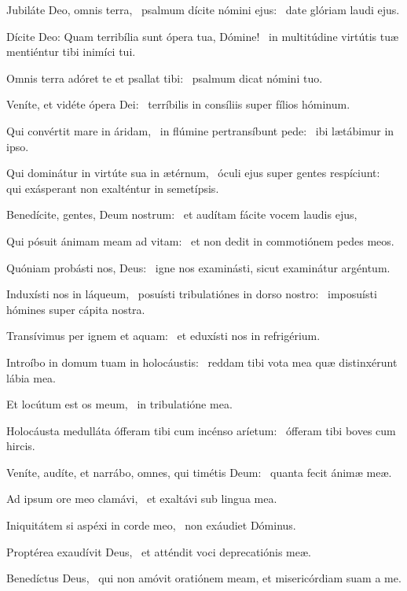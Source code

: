 \item Jubiláte Deo, omnis terra,~\pscross{} psalmum dícite nómini ejus:~\psstar{} date glóriam laudi ejus.

\item Dícite Deo: Quam terribília sunt ópera tua, Dómine!~\psstar{} in multitúdine virtútis tuæ mentiéntur tibi inimíci tui.

\item Omnis terra adóret te et psallat tibi:~\psstar{} psalmum dicat nómini tuo.

\item Veníte, et vidéte ópera Dei:~\psstar{} terríbilis in consíliis super fílios hóminum.

\item Qui convértit mare in áridam,~\pscross{} in flúmine pertransíbunt pede:~\psstar{} ibi lætábimur in ipso.

\item Qui dominátur in virtúte sua in ætérnum,~\pscross{} óculi ejus super gentes respíciunt:~\psstar{} qui exásperant non exalténtur in semetípsis.

\item Benedícite, gentes, Deum nostrum:~\psstar{} et audítam fácite vocem laudis ejus,

\item Qui pósuit ánimam meam ad vitam:~\psstar{} et non dedit in commotiónem pedes meos.

\item Quóniam probásti nos, Deus:~\psstar{} igne nos examinásti, sicut examinátur argéntum.

\item Induxísti nos in láqueum,~\pscross{} posuísti tribulatiónes in dorso nostro:~\psstar{} imposuísti hómines super cápita nostra.

\item Transívimus per ignem et aquam:~\psstar{} et eduxísti nos in refrigérium.

\item Introíbo in domum tuam in holocáustis:~\psstar{} reddam tibi vota mea quæ distinxérunt lábia mea.

\item Et locútum est os meum,~\psstar{} in tribulatióne mea.

\item Holocáusta medulláta ófferam tibi cum incénso aríetum:~\psstar{} ófferam tibi boves cum hircis.

\item Veníte, audíte, et narrábo, omnes, qui timétis Deum:~\psstar{} quanta fecit ánimæ meæ.

\item Ad ipsum ore meo clamávi,~\psstar{} et exaltávi sub lingua mea.

\item Iniquitátem si aspéxi in corde meo,~\psstar{} non exáudiet Dóminus.

\item Proptérea exaudívit Deus,~\psstar{} et atténdit voci deprecatiónis meæ.

\item Benedíctus Deus,~\psstar{} qui non amóvit oratiónem meam, et misericórdiam suam a me.


